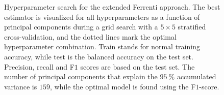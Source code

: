 \documentclass[superscriptaddress,unsortedaddress,
 amsmath,amssymb,
 aps,
]{revtex4-2}
\begin{document}
\begin{figure}[ht!]
  \begin{subfigure}[b]{1.0\textwidth}
    \centering
    
  \end{subfigure}
\par\bigskip
  \begin{subfigure}[b]{0.5\textwidth}
    
    \caption{}
    \label{fig:q2-LOG}
  \end{subfigure}%
  \hfill
  \begin{subfigure}[b]{0.5\textwidth}
    
    \caption{}
    \label{fig:q2-DT}
  \end{subfigure}

  \begin{subfigure}[b]{0.5\textwidth}
    
    \caption{}
    \label{fig:q2-RF}
  \end{subfigure}%
  \hfill
  \begin{subfigure}[b]{0.5\textwidth}
    
    \caption{}
    \label{fig:q2-GB}
  \end{subfigure}
  \caption{Hyperparameter search for the extended Ferrenti approach. The best estimator is visualized for all hyperparameters as a function of principal components during a grid search with a $5\times5$ stratified cross-validation, and the dotted lines mark the optimal hyperparameter combination. Train stands for normal training accuracy, while test is the balanced accuracy on the test set. Precision, recall and F$1$ scores \cite{geron2022,sammut2010} are based on the test set. The number of principal components that explain the $95 \ \%$ accumulated variance is $159$, while the optimal model is found using the F$1$-score.}
  \label{fig:02-pca}
\end{figure}
\end{document}
